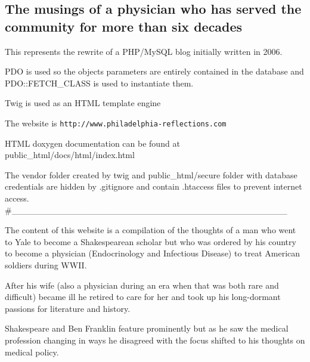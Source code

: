 \subsection*{The musings of a physician who has served the community for more than six decades}

This represents the rewrite of a P\+H\+P/\+My\+S\+QL blog initially written in 2006.


\begin{DoxyItemize}
\item P\+DO is used so the objects\textquotesingle{} parameters are entirely contained in the database and P\+D\+O\+::\+F\+E\+T\+C\+H\+\_\+\+C\+L\+A\+SS is used to instantiate them.
\item Twig is used as an H\+T\+ML template engine
\end{DoxyItemize}

The website is {\tt http\+://www.\+philadelphia-\/reflections.\+com}

H\+T\+ML doxygen documentation can be found at {\ttfamily public\+\_\+html/docs/html/index.\+html} 



The {\ttfamily vendor} folder created by twig and {\ttfamily public\+\_\+html/secure} folder with database credentials are hidden by {\ttfamily .gitignore} and contain {\ttfamily .htaccess} files to prevent internet access. \#\+\_\+\+\_\+\+\_\+\+\_\+\+\_\+\+\_\+\+\_\+\+\_\+\+\_\+\+\_\+\+\_\+\+\_\+\+\_\+\+\_\+\+\_\+\+\_\+\+\_\+\+\_\+\+\_\+\+\_\+\+\_\+\+\_\+\+\_\+\+\_\+\+\_\+\+\_\+\+\_\+\+\_\+\+\_\+\+\_\+\+\_\+\+\_\+\+\_\+\+\_\+\+\_\+\+\_\+\+\_\+\+\_\+\+\_\+\+\_\+\+\_\+\+\_\+\+\_\+\+\_\+

The content of this website is a compilation of the thoughts of a man who went to Yale to become a Shakespearean scholar but who was ordered by his country to become a physician (Endocrinology and Infectious Disease) to treat American soldiers during W\+W\+II.

After his wife (also a physician during an era when that was both rare and difficult) became ill he retired to care for her and took up his long-\/dormant passions for literature and history.

Shakespeare and Ben Franklin feature prominently but as he saw the medical profession changing in ways he disagreed with the focus shifted to his thoughts on medical policy. 